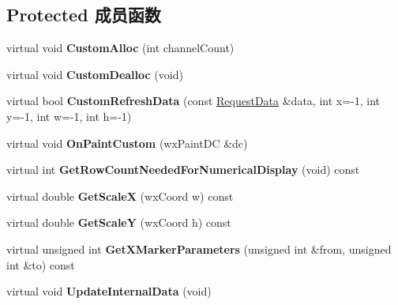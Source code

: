 \subsection*{Protected 成员函数}
\begin{DoxyCompactItemize}
\item 
\hypertarget{class_plot_canvas_intensity_a0bcc650b04945b70b726ad4154aecb70}{virtual void {\bfseries Custom\+Alloc} (int channel\+Count)}\label{class_plot_canvas_intensity_a0bcc650b04945b70b726ad4154aecb70}

\item 
\hypertarget{class_plot_canvas_intensity_a37ae3d3a6d7cbb8ae5d52ee51535039e}{virtual void {\bfseries Custom\+Dealloc} (void)}\label{class_plot_canvas_intensity_a37ae3d3a6d7cbb8ae5d52ee51535039e}

\item 
\hypertarget{class_plot_canvas_intensity_a88c2634a646c7eb1fb2a933e15d02246}{virtual bool {\bfseries Custom\+Refresh\+Data} (const \hyperlink{struct_request_data}{Request\+Data} \&data, int x=-\/1, int y=-\/1, int w=-\/1, int h=-\/1)}\label{class_plot_canvas_intensity_a88c2634a646c7eb1fb2a933e15d02246}

\item 
\hypertarget{class_plot_canvas_intensity_a45185a24068f99d279da6988e888d4d3}{virtual void {\bfseries On\+Paint\+Custom} (wx\+Paint\+D\+C \&dc)}\label{class_plot_canvas_intensity_a45185a24068f99d279da6988e888d4d3}

\item 
\hypertarget{class_plot_canvas_intensity_abe6766a7ea17ac59986e7a054d99e071}{virtual int {\bfseries Get\+Row\+Count\+Needed\+For\+Numerical\+Display} (void) const }\label{class_plot_canvas_intensity_abe6766a7ea17ac59986e7a054d99e071}

\item 
\hypertarget{class_plot_canvas_intensity_a9b8d03e415152c0760b3fe48b2246f86}{virtual double {\bfseries Get\+Scale\+X} (wx\+Coord w) const }\label{class_plot_canvas_intensity_a9b8d03e415152c0760b3fe48b2246f86}

\item 
\hypertarget{class_plot_canvas_intensity_a6264a36820269755a31d02a8cb3af876}{virtual double {\bfseries Get\+Scale\+Y} (wx\+Coord h) const }\label{class_plot_canvas_intensity_a6264a36820269755a31d02a8cb3af876}

\item 
\hypertarget{class_plot_canvas_intensity_aeebfbb9d13426acb46979b0d98e9a98e}{virtual unsigned int {\bfseries Get\+X\+Marker\+Parameters} (unsigned int \&from, unsigned int \&to) const }\label{class_plot_canvas_intensity_aeebfbb9d13426acb46979b0d98e9a98e}

\item 
\hypertarget{class_plot_canvas_intensity_a7259ce5470b603a6ca3843e0bf1821a8}{virtual void {\bfseries Update\+Internal\+Data} (void)}\label{class_plot_canvas_intensity_a7259ce5470b603a6ca3843e0bf1821a8}

\end{DoxyCompactItemize}
